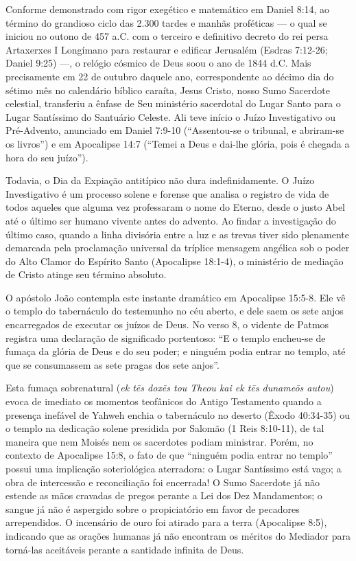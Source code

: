 \documentclass[11pt,a4paper,openany]{book}
\begin{document}
Conforme demonstrado com rigor exegético e matemático em Daniel 8:14, ao término do grandioso ciclo das 2.300 tardes e manhãs proféticas — o qual se iniciou no outono de 457 a.C. com o terceiro e definitivo decreto do rei persa Artaxerxes I Longímano para restaurar e edificar Jerusalém (Esdras 7:12-26; Daniel 9:25) —, o relógio cósmico de Deus soou o ano de 1844 d.C. Mais precisamente em 22 de outubro daquele ano, correspondente ao décimo dia do sétimo mês no calendário bíblico caraíta, Jesus Cristo, nosso Sumo Sacerdote celestial, transferiu a ênfase de Seu ministério sacerdotal do Lugar Santo para o Lugar Santíssimo do Santuário Celeste. Ali teve início o Juízo Investigativo ou Pré-Advento, anunciado em Daniel 7:9-10 (``Assentou-se o tribunal, e abriram-se os livros'') e em Apocalipse 14:7 (``Temei a Deus e dai-lhe glória, pois é chegada a hora do seu juízo'').

Todavia, o Dia da Expiação antitípico não dura indefinidamente. O Juízo Investigativo é um processo solene e forense que analisa o registro de vida de todos aqueles que alguma vez professaram o nome do Eterno, desde o justo Abel até o último ser humano vivente antes do advento. Ao findar a investigação do último caso, quando a linha divisória entre a luz e as trevas tiver sido plenamente demarcada pela proclamação universal da tríplice mensagem angélica sob o poder do Alto Clamor do Espírito Santo (Apocalipse 18:1-4), o ministério de mediação de Cristo atinge seu término absoluto.

O apóstolo João contempla este instante dramático em Apocalipse 15:5-8. Ele vê o templo do tabernáculo do testemunho no céu aberto, e dele saem os sete anjos encarregados de executar os juízos de Deus. No verso 8, o vidente de Patmos registra uma declaração de significado portentoso: ``E o templo encheu-se de fumaça da glória de Deus e do seu poder; e ninguém podia entrar no templo, até que se consumassem as sete pragas dos sete anjos''.

Esta fumaça sobrenatural (\textit{ek tēs doxēs tou Theou kai ek tēs dunameōs autou}) evoca de imediato os momentos teofânicos do Antigo Testamento quando a presença inefável de Yahweh enchia o tabernáculo no deserto (Êxodo 40:34-35) ou o templo na dedicação solene presidida por Salomão (1 Reis 8:10-11), de tal maneira que nem Moisés nem os sacerdotes podiam ministrar. Porém, no contexto de Apocalipse 15:8, o fato de que ``ninguém podia entrar no templo'' possui uma implicação soteriológica aterradora: o Lugar Santíssimo está vago; a obra de intercessão e reconciliação foi encerrada! O Sumo Sacerdote já não estende as mãos cravadas de pregos perante a Lei dos Dez Mandamentos; o sangue já não é aspergido sobre o propiciatório em favor de pecadores arrependidos. O incensário de ouro foi atirado para a terra (Apocalipse 8:5), indicando que as orações humanas já não encontram os méritos do Mediador para torná-las aceitáveis perante a santidade infinita de Deus.
\end{document}
